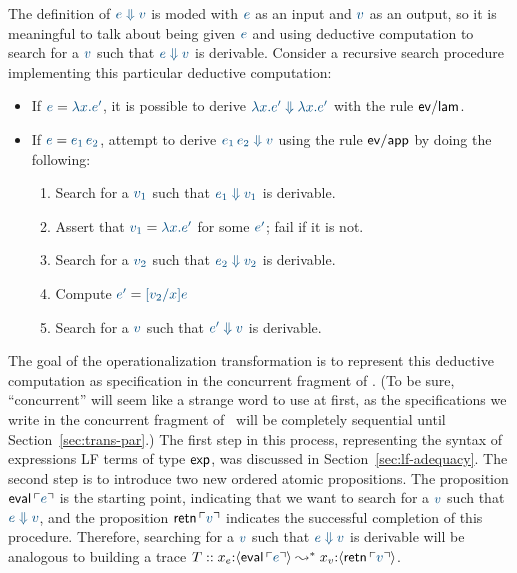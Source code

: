 The definition of $\obj{e \Downarrow v}$ is moded with $\obj{e}$ as an
input and $\obj{v}$ as an output, so it is meaningful to talk about
being given $\obj{e}$ and using deductive computation to search for a
$\obj{v}$ such that $\obj{e \Downarrow v}$ is derivable.  Consider a
recursive search procedure implementing this particular deductive
computation: \smallskip
\begin{itemize}
\item
      If $\obj{e} = \obj{\lambda x. e'}$, 
      it is possible to derive 
      $\obj{\lambda x. e' \Downarrow \lambda x. e'}$
      with the rule ${\sf ev/lam}$.
\item
       If $\obj{e} = \obj{e_1\,e_2}$,
       attempt to derive 
       $\obj{e_1\,e_2 \Downarrow v}$
       using the rule ${\sf ev/app}$ by doing the following:
    \begin{enumerate}
    \item Search for a $\obj{v_1}$ such that 
          $\obj{e_1 \Downarrow v_1}$ is derivable.
    \item Assert that $\obj{v_1} = \obj{\lambda x.e'}$ for some
          $\obj{e'}$; fail if it is not.
    \item Search for a $\obj{v_2}$ such that 
          $\obj{e_2 \Downarrow v_2}$ is derivable.
    \item Compute $\obj{e'} = \obj{[v_2/x]e}$
    \item Search for a $\obj{v}$ such that 
          $\obj{e' \Downarrow v}$ is derivable.
    \end{enumerate}
\end{itemize}
\smallskip
%
The goal of the operationalization transformation is to represent this
deductive computation as specification in the concurrent fragment of
\sls. (To be sure, ``concurrent'' will seem 
like a strange word to use at first, as
the specifications we write in the concurrent fragment of \sls~will 
be completely sequential until Section~\ref{sec:trans-par}.)
The first step in this process, representing the syntax
of expressions LF terms of type ${\sf exp}$, was discussed
in Section~\ref{sec:lf-adequacy}. The second step is to
introduce two new ordered atomic propositions.  The proposition ${\sf
  eval}\,\interp{e}$ is the starting point, indicating that we want to
search for a $\obj{v}$ such that $\obj{e \Downarrow v}$,
 and the proposition ${\sf
  retn}\,\interp{v}$ indicates the successful completion of this
procedure. Therefore, searching for a $\obj{v}$ such that 
$\obj{e \Downarrow v}$
is derivable will be analogous to building a trace $T ::
x_e{:}\susp{{\sf eval}\,\interp{e}} \leadsto^* x_v{:}\susp{{\sf
    retn}\,\interp{v}}$.

